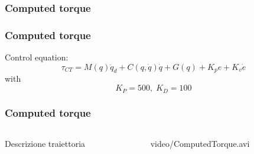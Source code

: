 \subsubsection{Computed torque}
%
\begin{frame}
\frametitle{Computed torque}
Control equation:
\begin{equation}
	\tau_{CT} = M(q)\ddot{q}_d + C(q,\dot{q})\dot{q} + G(q) + K_pe + K_v\dot{e}
\end{equation}
with
\begin{equation*}
K_P = 500, \; K_D = 100
\end{equation*}
\end{frame}
%
\begin{frame}
\frametitle{Computed torque}
%
\begin{columns}
\begin{column}{0.4\textwidth}
	Descrizione traiettoria
\end{column}
\begin{column}{0.6\textwidth}
	\begin{center}
		{video/ComputedTorque.avi}
	\end{center}
\end{column}
\end{columns}
\end{frame}
%
